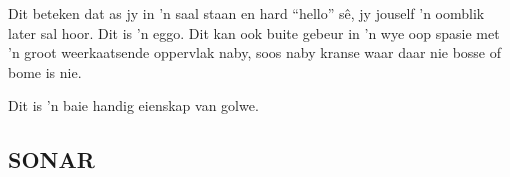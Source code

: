 Dit beteken dat as jy in 'n saal staan en hard ``hello'' s\^e, jy jouself 'n oomblik later sal hoor. Dit is 'n eggo. Dit kan ook buite gebeur in 'n wye oop spasie met 'n groot weerkaatsende oppervlak naby, soos naby kranse waar daar nie bosse of bome is nie.

Dit is 'n baie handig eienskap van golwe.

         \subsection*{SONAR}
            \nopagebreak
      \label{m38800*id185202}
\begin{minipage}{.5\textwidth}
      	\begin{figure}[H] %
    \begin{center}


\end{center}
\end{figure}
\end{minipage}
